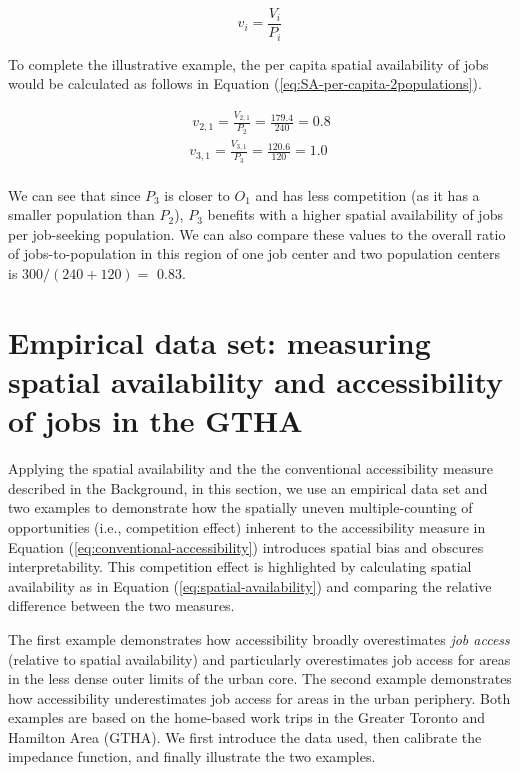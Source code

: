 \documentclass[]{elsarticle} %
\begin{document}
\begin{equation}
\label{eq:SA-per-capita}
v_i = \frac{V_i}{P_i}
\end{equation}

To complete the illustrative example, the per capita spatial
availability of jobs would be calculated as follows in Equation
(\ref{eq:SA-per-capita-2populations}).

\begin{equation}
\label{eq:SA-per-capita-2populations}
\begin{array}{l}\
v_{2,1} = \frac{V_{2,1}}{P_2} =  \frac{179.4}{240} = 0.8\\
v_{3,1} =  \frac{V_{3,1}}{P_3} =  \frac{120.6}{120} = 1.0\\
\end{array}
\end{equation}

We can see that since \(P_3\) is closer to \(O_1\) and has less
competition (as it has a smaller population than \(P_2\)), \(P_3\)
benefits with a higher spatial availability of jobs per job-seeking
population. We can also compare these values to the overall ratio of
jobs-to-population in this region of one job center and two population
centers is \(300/(240 + 120)=\) 0.83.

\hypertarget{empirical-data-set-measuring-spatial-availability-and-accessibility-of-jobs-in-the-gtha}{%
\section{Empirical data set: measuring spatial availability and
accessibility of jobs in the
GTHA}\label{empirical-data-set-measuring-spatial-availability-and-accessibility-of-jobs-in-the-gtha}}

Applying the spatial availability and the the conventional accessibility
measure described in the \protect\hypertarget{background}{}{Background},
in this section, we use an empirical data set and two examples to
demonstrate how the spatially uneven multiple-counting of opportunities
(i.e., competition effect) inherent to the accessibility measure in
Equation (\ref{eq:conventional-accessibility}) introduces spatial bias
and obscures interpretability. This competition effect is highlighted by
calculating spatial availability as in Equation
(\ref{eq:spatial-availability}) and comparing the relative difference
between the two measures.

The first example demonstrates how accessibility broadly overestimates
\emph{job access} (relative to spatial availability) and particularly
overestimates job access for areas in the less dense outer limits of the
urban core. The second example demonstrates how accessibility
underestimates job access for areas in the urban periphery. Both
examples are based on the home-based work trips in the Greater Toronto
and Hamilton Area (GTHA). We first introduce the data used, then
calibrate the impedance function, and finally illustrate the two
examples.
\end{document}
